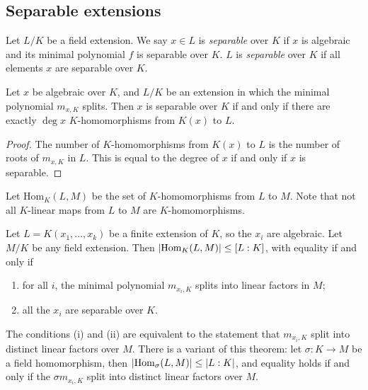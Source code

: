 \subsection{Separable extensions}
\begin{definition}
	Let \( L / K \) be a field extension.
	We say \( x \in L \) is \emph{separable} over \( K \) if \( x \) is algebraic and its minimal polynomial \( f \) is separable over \( K \).
	\( L \) is \emph{separable} over \( K \) if all elements \( x \) are separable over \( K \).
\end{definition}
\begin{theorem}
	Let \( x \) be algebraic over \( K \), and \( L / K \) be an extension in which the minimal polynomial \( m_{x,K} \) splits.
	Then \( x \) is separable over \( K \) if and only if there are exactly \( \deg x \) \( K \)-homomorphisms from \( K(x) \) to \( L \).
\end{theorem}
\begin{proof}
	The number of \( K \)-homomorphisms from \( K(x) \) to \( L \) is the number of roots of \( m_{x,K} \) in \( L \).
	This is equal to the degree of \( x \) if and only if \( x \) is separable.
\end{proof}
Let \( \mathrm{Hom}_K(L,M) \) be the set of \( K \)-homomorphisms from \( L \) to \( M \).
Note that not all \( K \)-linear maps from \( L \) to \( M \) are \( K \)-homomorphisms.
\begin{theorem}
	Let \( L = K(x_1, \dots, x_k) \) be a finite extension of \( K \), so the \( x_i \) are algebraic.
	Let \( M / K \) be any field extension.
	Then \( \abs{\mathrm{Hom}_K(L,M)} \leq [L : K] \), with equality if and only if
	\begin{enumerate}
		\item for all \( i \), the minimal polynomial \( m_{x_i,K} \) splits into linear factors in \( M \);
		\item all the \( x_i \) are separable over \( K \).
	\end{enumerate}
\end{theorem}
\begin{remark}
	The conditions (i) and (ii) are equivalent to the statement that \( m_{x_i,K} \) split into distinct linear factors over \( M \).
	There is a variant of this theorem: let \( \sigma : K \to M \) be a field homomorphism, then \( \abs{\mathrm{Hom}_\sigma(L,M)} \leq \abs{L:K} \), and equality holds if and only if the \( \sigma m_{x_i,K} \) split into distinct linear factors over \( M \).
\end{remark}
